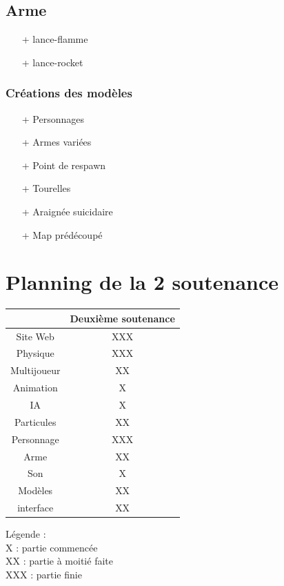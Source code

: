 ﻿\documentclass[12pt]{article}
\begin{document}
\subsection{Arme}
\begin{itemize}
\item[+] lance-flamme
\item[+] lance-rocket
\end{itemize}


\subsubsection{Créations des modèles}
\begin{itemize}
\item[+] Personnages
\item[+] Armes variées
\item[+] Point de respawn
\item[+] Tourelles
\item[+] Araignée suicidaire
\item[+] Map prédécoupé
\end{itemize}

\section{Planning de la 2\ieme{} soutenance}
\begin{tabular}{|c|c|}
\hline

			& Deuxième soutenance\\ \hline
Site Web	& XXX	\\ \hline
Physique	& XXX	\\ \hline
Multijoueur	& XX	\\ \hline
Animation	& X		\\ \hline
IA	        & X		\\ \hline
Particules	& XX	\\ \hline
Personnage	& XXX	\\ \hline
Arme		& XX	\\ \hline
Son			& X		\\ \hline
Modèles		& XX	\\ \hline
interface	& XX	\\ \hline
\end{tabular}


Légende :\\
X : partie commencée\\
XX : partie à moitié faite\\
XXX : partie finie
\end{document}
